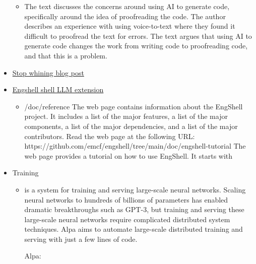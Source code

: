 \begin{itemize}
  \begin{itemize}
  \tightlist
  \item
    The text discusses the concerns around using AI to generate code,
    specifically around the idea of proofreading the code. The author
    describes an experience with using voice-to-text where they found it
    difficult to proofread the text for errors. The text argues that
    using AI to generate code changes the work from writing code to
    proofreading code, and that this is a problem.
  \end{itemize}
\item
  \href{https://about.sourcegraph.com/blog/cheating-is-all-you-need}{Stop
  whining blog post}
\item
  \href{https://github.com/emcf/engshell/tree/main}{Engshell shell LLM
  extension}

  \begin{itemize}
  \tightlist
  \item
    /doc/reference The web page contains information about the EngShell
    project. It includes a list of the major features, a list of the
    major components, a list of the major dependencies, and a list of
    the major contributors. Read the web page at the following URL:
    https://github.com/emcf/engshell/tree/main/doc/engshell-tutorial The
    web page provides a tutorial on how to use EngShell. It starts with
  \end{itemize}
\item
  Training

  \begin{itemize}
  \item
    \href{https://github.com/alpa-projects/alpa}{}

    is a system for training and serving large-scale neural networks.
    Scaling neural networks to hundreds of billions of parameters has
    enabled dramatic breakthroughs such as GPT-3, but training and
    serving these large-scale neural networks require complicated
    distributed system techniques. Alpa aims to automate large-scale
    distributed training and serving with just a few lines of code.

    Alpa:


\end{itemize}
\end{itemize}
